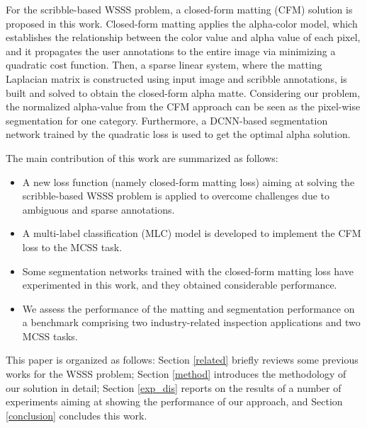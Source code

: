 \documentclass[journal]{IEEEtran}
\begin{document}
For the scribble-based WSSS problem, a closed-form matting (CFM) solution is proposed in this work. Closed-form matting \cite{levin2007closed} applies the alpha-color model, which establishes the relationship between the color value and alpha value of each pixel, and it propagates the user annotations to the entire image via minimizing a quadratic cost function. Then, a sparse linear system, where the matting Laplacian matrix is constructed using input image and scribble annotations, is built and solved to obtain the closed-form alpha matte. Considering our problem, the normalized alpha-value from the CFM approach can be seen as the pixel-wise segmentation for one category. Furthermore, a DCNN-based segmentation network trained by the quadratic loss is used to get the optimal alpha solution. 

The main contribution of this work are summarized as follows:
\begin{itemize}
    \item A new loss function (namely closed-form matting loss) aiming at solving the scribble-based WSSS problem is applied to overcome challenges due to ambiguous and sparse annotations.
    \item A multi-label classification (MLC) model is developed to implement the CFM loss to the MCSS task.  
    \item Some segmentation networks trained with the closed-form matting loss have experimented in this work, and they obtained considerable performance.
    \item We assess the performance of the matting and segmentation performance on a benchmark comprising two industry-related inspection applications and two MCSS tasks.
\end{itemize}

This paper is organized as follows: Section \ref{related} briefly reviews some previous works for the WSSS problem; Section \ref{method} introduces the methodology of our solution in detail; Section \ref{exp_dis} reports on the results of a number of experiments aiming at showing the performance of our approach, and Section \ref{conclusion} concludes this work. 
\end{document}
